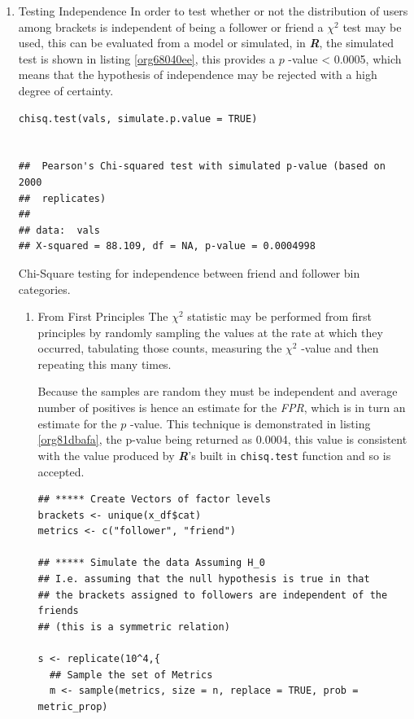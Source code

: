 \documentclass[11pt]{article}
\begin{document}
\begin{enumerate}
\item Testing Independence
\label{sec:org391e280}
In order to test whether or not the distribution of users among brackets is
independent of being a follower or friend a \(\chi^{2}\) test may be used, this
can be evaluated from a model or simulated, in \textbf{\emph{R}}, the simulated test is
shown in listing \ref{org68040ee}, this provides a \(p\) -value < 0.0005, which means that the hypothesis of independence may be rejected with a high degree of certainty.

\begin{listing}[htbp]
\begin{verbatim}
chisq.test(vals, simulate.p.value = TRUE)


## 	Pearson's Chi-squared test with simulated p-value (based on 2000
## 	replicates)
##
## data:  vals
## X-squared = 88.109, df = NA, p-value = 0.0004998
\end{verbatim}
\caption{\label{org68040ee}Chi-Square testing for independence between friend and follower bin categories.}
\end{listing}

\begin{enumerate}
\item From First Principles
\label{sec:org5944025}
The \(\chi^{2}\) statistic may be performed from first principles by randomly
sampling the values at the rate at which they occurred, tabulating those counts, measuring the \(\chi^{2}\) -value and then repeating this many times.

Because the samples are random they must be independent and average number of
positives is hence an estimate for the \emph{FPR}, which is in turn an estimate for
the \(p\) -value. This technique is demonstrated in listing \ref{org81dbafa}, the p-value
being returned as 0.0004, this value is consistent with the value produced by
\textbf{\emph{R}}'s built in \texttt{chisq.test} function and so is accepted.

\begin{listing}[htbp]
\begin{verbatim}
## ***** Create Vectors of factor levels
brackets <- unique(x_df$cat)
metrics <- c("follower", "friend")

## ***** Simulate the data Assuming H_0
## I.e. assuming that the null hypothesis is true in that
## the brackets assigned to followers are independent of the friends
## (this is a symmetric relation)

s <- replicate(10^4,{
  ## Sample the set of Metrics
  m <- sample(metrics, size = n, replace = TRUE, prob = metric_prop)


\end{verbatim}
\end{listing}
\end{enumerate}
\end{enumerate}
\end{document}
